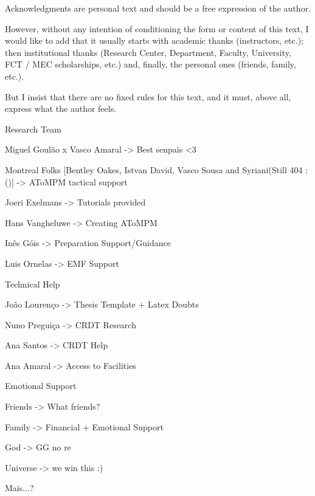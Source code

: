 
%

\begin{ntacknowledgements}

Acknowledgments are personal text and should be a free expression of the author.

However, without any intention of conditioning the form or content of this text, I would like to add that it usually starts with academic thanks (instructors, etc.); then institutional thanks (Research Center, Department, Faculty, University, FCT / MEC scholarships, etc.) and, finally, the personal ones (friends, family, etc.).

But I insist that there are no fixed rules for this text, and it must, above all, express what the author feels.

Research Team

Miguel Goulão x Vasco Amaral -> Best senpais <3

Montreal Folks [Bentley Oakes, Istvan David, Vasco Sousa and Syriani(Still 404 :()] -> AToMPM tactical support

Joeri Exelmans -> Tutorials provided

Hans Vangheluwe -> Creating AToMPM

Inês Góis -> Preparation Support/Guidance

Luis Ornelas -> EMF Support

Technical Help

João Lourenço -> Thesis Template + Latex Doubts

Nuno Preguiça -> CRDT Research

Ana Santos -> CRDT Help

Ana Amaral -> Access to Facilities

Emotional Support

Friends -> What friends? 
 
Family -> Financial + Emotional Support

God -> GG no re

Universe -> we win this :)

Mais...?

\end{ntacknowledgements}